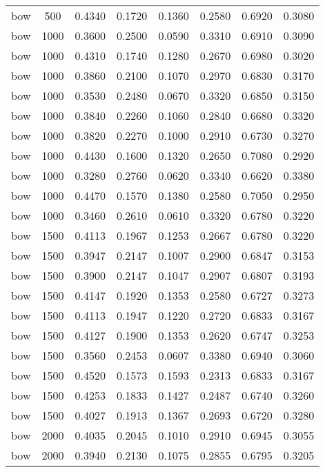\begin{scriptsize}
\begin{longtable}{cccccccc}
		bow      & 500  & 0.4340 & 0.1720 & 0.1360 & 0.2580 & 0.6920 & 0.3080 \\
		bow      & 1000 & 0.3600 & 0.2500 & 0.0590 & 0.3310 & 0.6910 & 0.3090 \\
		bow      & 1000 & 0.4310 & 0.1740 & 0.1280 & 0.2670 & 0.6980 & 0.3020 \\
		bow      & 1000 & 0.3860 & 0.2100 & 0.1070 & 0.2970 & 0.6830 & 0.3170 \\
		bow      & 1000 & 0.3530 & 0.2480 & 0.0670 & 0.3320 & 0.6850 & 0.3150 \\
		bow      & 1000 & 0.3840 & 0.2260 & 0.1060 & 0.2840 & 0.6680 & 0.3320 \\
		bow      & 1000 & 0.3820 & 0.2270 & 0.1000 & 0.2910 & 0.6730 & 0.3270 \\
		bow      & 1000 & 0.4430 & 0.1600 & 0.1320 & 0.2650 & 0.7080 & 0.2920 \\
		bow      & 1000 & 0.3280 & 0.2760 & 0.0620 & 0.3340 & 0.6620 & 0.3380 \\
		bow      & 1000 & 0.4470 & 0.1570 & 0.1380 & 0.2580 & 0.7050 & 0.2950 \\
		bow      & 1000 & 0.3460 & 0.2610 & 0.0610 & 0.3320 & 0.6780 & 0.3220 \\
		bow      & 1500 & 0.4113 & 0.1967 & 0.1253 & 0.2667 & 0.6780 & 0.3220 \\
		bow      & 1500 & 0.3947 & 0.2147 & 0.1007 & 0.2900 & 0.6847 & 0.3153 \\
		bow      & 1500 & 0.3900 & 0.2147 & 0.1047 & 0.2907 & 0.6807 & 0.3193 \\
		bow      & 1500 & 0.4147 & 0.1920 & 0.1353 & 0.2580 & 0.6727 & 0.3273 \\
		bow      & 1500 & 0.4113 & 0.1947 & 0.1220 & 0.2720 & 0.6833 & 0.3167 \\
		bow      & 1500 & 0.4127 & 0.1900 & 0.1353 & 0.2620 & 0.6747 & 0.3253 \\
		bow      & 1500 & 0.3560 & 0.2453 & 0.0607 & 0.3380 & 0.6940 & 0.3060 \\
		bow      & 1500 & 0.4520 & 0.1573 & 0.1593 & 0.2313 & 0.6833 & 0.3167 \\
		bow      & 1500 & 0.4253 & 0.1833 & 0.1427 & 0.2487 & 0.6740 & 0.3260 \\
		bow      & 1500 & 0.4027 & 0.1913 & 0.1367 & 0.2693 & 0.6720 & 0.3280 \\
		bow      & 2000 & 0.4035 & 0.2045 & 0.1010 & 0.2910 & 0.6945 & 0.3055 \\
		bow      & 2000 & 0.3940 & 0.2130 & 0.1075 & 0.2855 & 0.6795 & 0.3205 \\

\end{longtable}
\end{scriptsize}
